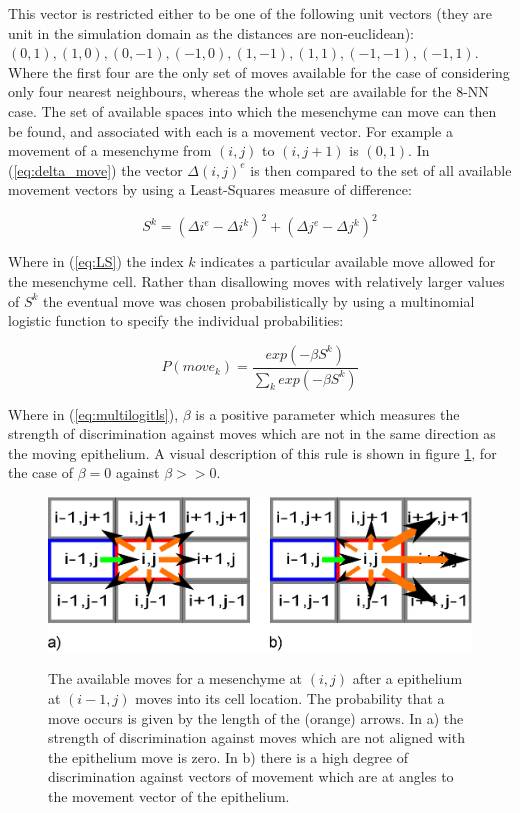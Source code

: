 \documentclass[pdftex,10pt,a4paper]{article}
\begin{document}
This vector is restricted either to be one of the following unit vectors (they are unit in the simulation domain as the distances are non-euclidean): $(0,1),(1,0),(0,-1),(-1,0),(1,-1),(1,1),(-1,-1),(-1,1)$. Where the first four are the only set of moves available for the case of considering only four nearest neighbours, whereas the whole set are available for the 8-NN case. The set of available spaces into which the mesenchyme can move can then be found, and associated with each is a movement vector. For example a movement of a mesenchyme from $(i,j)$ to $(i,j+1)$ is $(0,1)$.
In (\ref{eq:delta_move}) the vector $\Delta(i,j)^e$ is then compared to the set of all available movement vectors by using a Least-Squares measure of difference:

\begin{equation}\label{eq:LS}
S^k = (\Delta i^e - \Delta i^k)^2 + (\Delta j^e - \Delta j^k)^2
\end{equation}

Where in (\ref{eq:LS}) the index $k$ indicates a particular available move allowed for the mesenchyme cell. Rather than disallowing moves with relatively larger values of $S^k$ the eventual move was chosen probabilistically by using a multinomial logistic function to specify the individual probabilities:

\begin{equation} \label{eq:multilogitls}
P(move_k) = \frac{exp(-\beta S^k)}{\sum\limits_{k} exp(-\beta S^k)}
\end{equation}

Where in (\ref{eq:multilogitls}), $\beta$ is a positive parameter which measures the strength of discrimination against moves which are not in the same direction as the moving epithelium. A visual description of this rule is shown in figure \ref{fig:arrows}, for the case of $\beta=0$ against $\beta>>0$.

\begin{figure}[ht] 
\centering
\scalebox{0.5} 
{\includegraphics{weighting.eps}}
\caption{The available moves for a mesenchyme at $(i,j)$ after a epithelium at $(i-1,j)$ moves into its cell location. The probability that a move occurs is given by the length of the (orange) arrows. In a) the strength of discrimination against moves which are not aligned with the epithelium move is zero. In b) there is a high degree of discrimination against vectors of movement which are at angles to the movement vector of the epithelium.}\label{fig:arrows}
\end{figure} 
\end{document}
